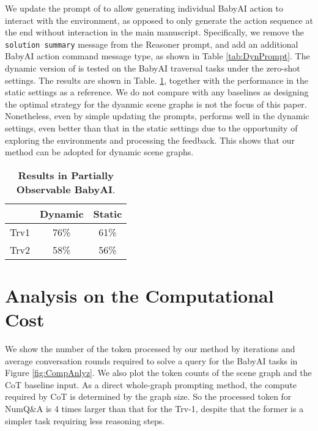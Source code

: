 We update the prompt of \RwR to allow generating individual BabyAI action to interact with the environment, as opposed to only generate the action sequence at the end without interaction in the main manuscript. Specifically, we remove the \texttt{\small solution summary} message from the Reasoner prompt, and add an additional BabyAI action command message type, as shown in Table \ref{tab:DynPrompt}. The dynamic version of \RwR is tested on the BabyAI traversal tasks under the zero-shot settings. The results are shown in Table. \ref{tab:DynResults}, together with the performance in the static settings as a reference. We do not compare with any baselines as designing the optimal strategy for the dyanmic scene graphs is not the focus of this paper. Nonetheless, even by simple updating the prompts, \RwR performs well in the dynamic settings, even better than that in the static settings due to the opportunity of exploring the environments and processing the feedback. This shows that our method can be adopted for dynamic scene graphs.

\begin{table}[h!]
    \centering
    \setlength{}
    \setlength\extrarowheight{2pt}
    \begin{tabular}{l  c c  }
        \toprule[1.5pt]
         & Dynamic & Static \\
        \hline 
         Trv1  & 76\% & 61\%  \\
         Trv2  & 58\% & 56\% \\
        \bottomrule[1.5pt]
    \end{tabular}
    \caption{
        \textbf{Results in Partially Observable BabyAI}. 
    }\label{tab:DynResults}
\end{table}

\section{Analysis on the Computational Cost}
\label{app:ComputeAnly}

We show the number of the token processed by our method by iterations and average conversation rounds required to solve a query for the BabyAI tasks in Figure \ref{fig:CompAnlyz}. We also plot the token counts of the scene graph and the CoT baseline input.
As a direct whole-graph prompting method, the compute required by CoT is determined by the graph size. So the processed token for NumQ\&A is 4 times larger than that for the Trv-1, despite that the former is a simpler task requiring less reasoning steps.

